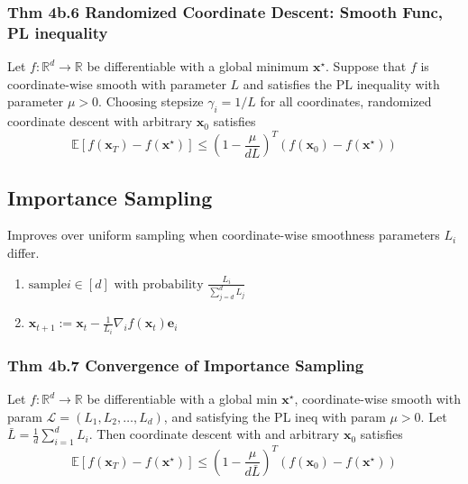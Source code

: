 \subsubsection*{Thm 4b.6 Randomized Coordinate Descent: Smooth Func, PL inequality}
Let $f: \mathbb{R}^{d} \rightarrow \mathbb{R}$ be differentiable with a global minimum $\mathbf{x}^{\star}$. Suppose that $f$ is coordinate-wise smooth with parameter $L$ and satisfies the $\mathrm{PL}$ inequality with parameter $\mu>0$. Choosing stepsize $\gamma_{i}=1 / L$ for all coordinates, randomized coordinate descent with arbitrary $\mathbf{x}_{0}$ satisfies
$$
\mathbb{E}\left[f\left(\mathbf{x}_{T}\right)-f\left(\mathbf{x}^{\star}\right)\right] \leq\left(1-\frac{\mu}{d L}\right)^{T}\left(f\left(\mathbf{x}_{0}\right)-f\left(\mathbf{x}^{\star}\right)\right)
$$







\subsection*{Importance Sampling}
Improves over uniform sampling when coordinate-wise smoothness parameters $L_{i}$ differ.
\begin{enumerate}[label = (\roman*), leftmargin=*]
\item $\text{sample} i \in[d] \text { with probability } \frac{L_{i}}{\sum_{j=d}^{d} L_{j}}$
\item $\mathbf{x}_{t+1}:=\mathbf{x}_{t}-\frac{1}{L_{i}} \nabla_{i} f\left(\mathbf{x}_{t}\right) \mathbf{e}_{i}$
\end{enumerate}

\subsubsection*{Thm 4b.7 Convergence of Importance Sampling}
Let $f: \mathbb{R}^{d} \rightarrow \mathbb{R}$ be differentiable with a global min $\mathbf{x}^{\star}$, coordinate-wise smooth with param $\mathcal{L}=\left(L_{1}, L_{2}, \ldots, L_{d}\right)$, and satisfying the PL ineq with param $\mu>0$. Let $\bar{L}=\frac{1}{d} \sum_{i=1}^{d} L_{i}$. Then coordinate descent with  and arbitrary $\mathbf{x}_{0}$ satisfies
$$
\mathbb{E}\left[f\left(\mathbf{x}_{T}\right)-f\left(\mathbf{x}^{\star}\right)\right] \leq\left(1-\frac{\mu}{d \bar{L}}\right)^{T}\left(f\left(\mathbf{x}_{0}\right)-f\left(\mathbf{x}^{\star}\right)\right)
$$

